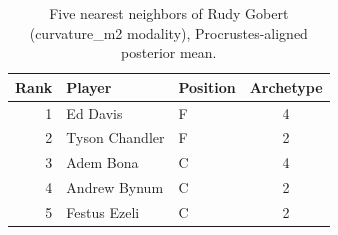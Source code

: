 \begin{table}[htbp]
  \centering\small
  \begin{tabular}{rllc}
    \toprule
    Rank & Player & Position & Archetype \\
    \midrule
    1 & Ed Davis & F & 4 \\
    2 & Tyson Chandler & F & 2 \\
    3 & Adem Bona & C & 4 \\
    4 & Andrew Bynum & C & 2 \\
    5 & Festus Ezeli & C & 2 \\
    \bottomrule
  \end{tabular}
  \caption{Five nearest neighbors of Rudy Gobert (curvature_m2 modality), Procrustes-aligned posterior mean.}
  \label{tab:Rudy_Gobert_neighbors_curvature_m2}
\end{table}

